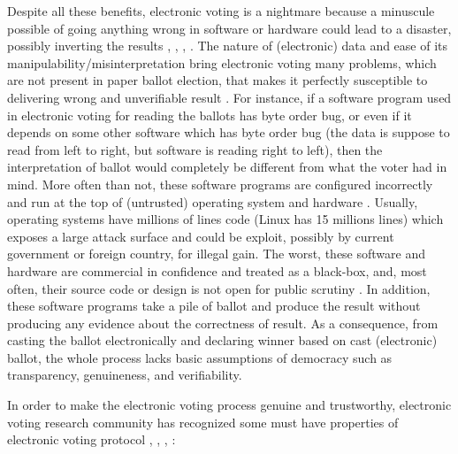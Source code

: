    
  Despite all these benefits, electronic voting is a nightmare because a minuscule possible of 
  going anything wrong in software or hardware could lead to a disaster,   possibly 
  inverting the results \citep{TSwiss},
  \citep{10.1007/978-3-319-22270-7_3}, \citep{ARANHA2019335},
  \citep{Feldman:2007:SAD:1323111.1323113}.  The nature of (electronic) data and ease of 
  its manipulability/misinterpretation bring electronic voting many problems, which are not present in paper ballot election, that 
  makes it perfectly susceptible to delivering wrong and unverifiable result \citep{Wolchok:2010:SAI:1866307.1866309}.
  For instance,  if a software program used in electronic voting 
  for reading the ballots has byte order bug, or even if it depends on some other software which has byte order bug (the data is suppose to read 
  from left to right, but software is reading right to left), then the interpretation of 
  ballot would completely be different from what the voter had in mind.
  More often than not, these software programs are configured incorrectly and run at the top of (untrusted) operating 
  system and hardware \citep{1301313}. Usually, operating systems have millions of lines code (Linux has 15 millions lines) which exposes
  a large attack surface and could be exploit, possibly by current government or foreign country, for illegal gain.
  The worst, these software and hardware  are commercial in 
  confidence and treated as a black-box, and, most often, their source code or design is not open 
  for public scrutiny \citep{AEC:2013:LMM}. In addition, these software programs 
  take a pile of ballot and produce the result without producing any evidence about the correctness of result.  As a consequence,
  from casting the ballot electronically and declaring winner based on cast (electronic) ballot, the whole process lacks basic assumptions
  of democracy such as transparency, genuineness, and verifiability. 
  
  In order to make the electronic voting process genuine and trustworthy, electronic voting 
  research community has recognized some must have properties of electronic voting protocol
  \citep{5958051}, 
   \citep{Benaloh:1994:RSE:195058.195407},  \citep{Delaune:2010:VPT}, \citep{Bernhard:2017:PES}:
  

